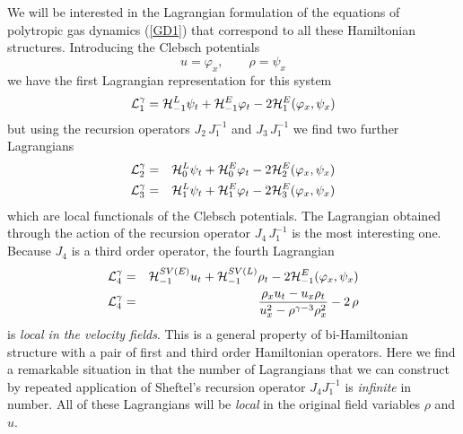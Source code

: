 \documentclass[a4paper,12pt]{article}
\begin{document}
   We will be interested in the Lagrangian formulation of the equations
of polytropic gas dynamics (\ref{GD1}) that correspond to all these
Hamiltonian structures. Introducing the Clebsch potentials \cite{n3}
\begin{equation}
u=\varphi_{x},  \qquad \rho =\psi_{x} \label{potentials}
\end{equation}
we have the first Lagrangian representation for this system
\begin{equation}
{\cal L}_1^{\gamma} = {\cal H}_{-1}^L \psi_{t} + {\cal H}_{-1}^E
\varphi_{t} - 2 {\cal H}_{1}^E (\varphi _{x},\psi_{x})
\label{lag1}
\end{equation}
but using the recursion operators $J_2 \, J_1^{-1}$ and $J_3 \,
J_1^{-1}$ we find two further Lagrangians
\begin{eqnarray}
{\cal L}_{2}^{\gamma} & = & {\cal H}_{0}^L \psi _{t} + {\cal
H}_{0}^E \varphi_{t} - 2 {\cal H}_{2}^E (\varphi _{x},\psi_{x})
\label{lag2} \\
{\cal L}_{3}^{\gamma} & = & {\cal H}_{1}^L \psi _{t} + {\cal
H}_{1}^E \varphi_{t} - 2 {\cal H}_{3}^E (\varphi _{x},\psi_{x})
\label{lag3}
\end{eqnarray}
which are local functionals of the Clebsch potentials. The
Lagrangian obtained through the action of the recursion operator
$J_4 \, J_1^{-1}$ is the most interesting one. Because $J_4$ is a
third order operator, the fourth Lagrangian
\begin{eqnarray}
{\cal L}_{4}^{\gamma} & = & {\cal H}^{SV(E)}_{-1} u_{t} + {\cal
H}^{SV(L)}_{-1} \rho_{t} - 2 {\cal H}_{-1}^E (\varphi
_{x},\psi_{x})
\label{lag4} \\
{\cal L}_{4}^{\gamma}& = &  \frac{\rho_{x} u_{t} - u_{x} \rho
_{t}} {u_{x}^{2}-\rho ^{\gamma -3}\rho_{x}^{2}}- 2 \, \rho
\label{p}
\end{eqnarray}
is {\it local in the velocity fields}. This is a general property
of bi-Hamiltonian structure with a pair of first and third order
Hamiltonian operators. Here we find a remarkable situation in that
the number of Lagrangians that we can construct by repeated
application of Sheftel's recursion operator $J_4 J_1^{-1}$ is {\it
infinite} in number. All of these Lagrangians will be {\it local}
in the original field variables $\rho$ and $u$.
\end{document}
